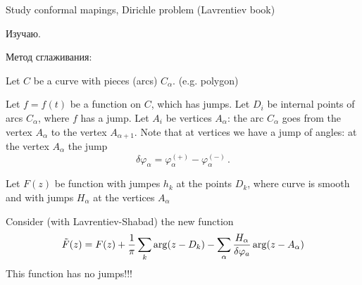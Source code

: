



\baselineskip=14pt
\def\vare {\varepsilon}
\def\A {{\bf A}}
\def\t {\tilde}
\def\a {\alpha}
\def\K {{\bf K}}
\def\N {{\bf N}}
\def\w {\omega}
\def\s {{\sigma}}
\def\S {{\Sigma}}
\def\s {{\sigma}}
\def\p{\partial}
\def\vare{{\varepsilon}}
\def\Q {{\bf Q}}
\def\D {{\cal D}}
\def\G {{\Gamma}}
\def\C {{\bf C}}
\def\L {{\cal L}}
\def\Z {{\bf Z}}
\def\U  {{\cal U}}
\def\H {{\cal H}}
\def\R  {{\bf R}}
\def\S  {{\bf S}}
\def\E  {{\bf E}}
\def\l {\lambda}
\def\degree {{\bf {\rm degree}\,\,}}
\def \finish {${\,\,\vrule height1mm depth2mm width 8pt}$}
\def \m {\medskip}
\def\p {\partial}
\def\r {{\bf r}}
\def\pt {{\bf pt}}
\def\v {{\bf v}}
\def\n {{\bf n}}
\def\t {{\bf t}}
\def\b {{\bf b}}
\def\c {{\bf c }}
\def\e{{\bf e}}
\def\ac {{\bf a}}
\def \X   {{\bf X}}
\def \Y   {{\bf Y}}
\def \x   {{\bf x}}
\def \y   {{\bf y}}
\def \G{{\cal G}}
\def\ss  {\sigma_{\rm sph}}
\def\grad {{\rm grad\,}}



      Study conformal mapings, Dirichle problem (Lavrentiev book)
      
            Изучаю.


       Метод сглаживания:

   Let $C$ be a curve with pieces (arcs) $C_\a$.
  (e.g. polygon)
   
  Let $f=f(t)$ be a function on $C$, 
which has jumps.
Let $D_i$ be internal points
of arcs $C_\a$, where $f$ has a jump.
Let $A_i$ be vertices $A_\a$: the arc $C_\a$ 
goes from the vertex $A_\a$
to the vertex $A_{\a+1}$.
  Note that at vertices we have a jump of 
angles: at the vertex $A_\a$ 
the jump $$
\delta\varphi_\a=
\varphi_\a^{(+)}-
\varphi_\a^{(-)}\,.
    $$
 
      Let  $F(z)$ be function with jumpes $h_k$
at the points $D_k$, where curve is smooth and
  with jumps $H_\a$ at the vertices $A_\a$

Consider (with Lavrentiev-Shabad) the new 
function
          $$
\tilde F(z)=F(z)+
{1\over \pi}\sum_k\arg (z-D_k)-
  \sum_\a {H_\a\over \delta\varphi_a}
\arg(z-A_\a )
          $$
This function has no jumps!!!

\bye
